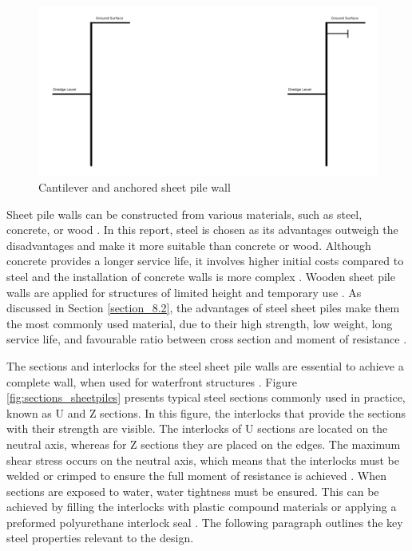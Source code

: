 \begin{figure}[H]
    \centering
    \includegraphics[width=0.75\linewidth]{figures/ch8/cantilever_anchored.png}
    \caption{Cantilever and anchored sheet pile wall}
    \label{fig:sheetpiles}
\end{figure}

Sheet pile walls can be constructed from various materials, such as steel, concrete, or wood \autocite{brownDesignSheetPile1994}. In this report, steel is chosen as its advantages outweigh the disadvantages and make it more suitable than concrete or wood. Although concrete provides a longer service life, it involves higher initial costs compared to steel and the installation of concrete walls is more complex \autocite{brownDesignSheetPile1994}. Wooden sheet pile walls are applied for structures of limited height and temporary use \autocite{brownDesignSheetPile1994}. As discussed in Section \ref{section_8.2}, the advantages of steel sheet piles make them the most commonly used material, due to their high strength, low weight, long service life, and favourable ratio between cross section and moment of resistance \autocite{brownDesignSheetPile1994}. 

The sections and interlocks for the steel sheet pile walls are essential to achieve a complete wall, when used for waterfront structures \autocite{baxterPilingHandbook2022}. Figure \ref{fig:sections_sheetpiles} presents typical steel sections commonly used in practice, known as U and Z sections. In this figure, the interlocks that provide the sections with their strength are visible. The interlocks of U sections are located on the neutral axis, whereas for Z sections they are placed on the edges. The maximum shear stress occurs on the neutral axis, which means that the interlocks must be welded or crimped to ensure the full moment of resistance is achieved \autocite{kellyMechanicsLectureNotes2018}. When sections are exposed to water, water tightness must be ensured. This can be achieved by filling the interlocks with plastic compound materials or applying a preformed polyurethane interlock seal \autocite{baxterPilingHandbook2022}. The following paragraph outlines the key steel properties relevant to the design.

